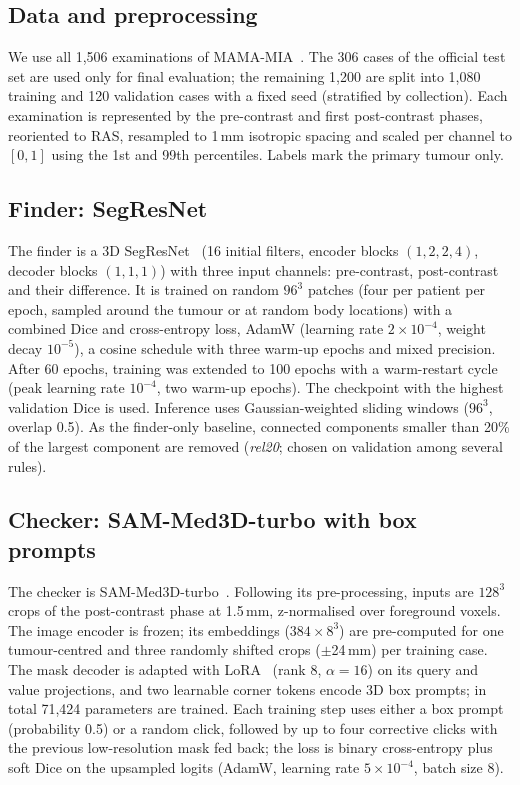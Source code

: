 \documentclass[journal]{IEEEtran}
\begin{document}
\subsection{Data and preprocessing}
We use all 1,506 examinations of MAMA-MIA~\cite{garrucho2025mamamia}. The 306 cases of the official test set are used only for final evaluation; the remaining 1,200 are split into 1,080 training and 120 validation cases with a fixed seed (stratified by collection). Each examination is represented by the pre-contrast and first post-contrast phases, reoriented to RAS, resampled to 1\,mm isotropic spacing and scaled per channel to $[0,1]$ using the 1st and 99th percentiles. Labels mark the primary tumour only.

\subsection{Finder: SegResNet}
The finder is a 3D SegResNet~\cite{myronenko2019segresnet} (16 initial filters, encoder blocks $(1,2,2,4)$, decoder blocks $(1,1,1)$) with three input channels: pre-contrast, post-contrast and their difference. It is trained on random $96^3$ patches (four per patient per epoch, sampled around the tumour or at random body locations) with a combined Dice and cross-entropy loss, AdamW (learning rate $2\times10^{-4}$, weight decay $10^{-5}$), a cosine schedule with three warm-up epochs and mixed precision. After 60 epochs, training was extended to 100 epochs with a warm-restart cycle (peak learning rate $10^{-4}$, two warm-up epochs). The checkpoint with the highest validation Dice is used. Inference uses Gaussian-weighted sliding windows ($96^3$, overlap 0.5). As the finder-only baseline, connected components smaller than 20\% of the largest component are removed (\emph{rel20}; chosen on validation among several rules).

\subsection{Checker: SAM-Med3D-turbo with box prompts}
The checker is SAM-Med3D-turbo~\cite{wang2023sammed3d}. Following its pre-processing, inputs are $128^3$ crops of the post-contrast phase at 1.5\,mm, z-normalised over foreground voxels. The image encoder is frozen; its embeddings ($384\times8^3$) are pre-computed for one tumour-centred and three randomly shifted crops ($\pm$24\,mm) per training case. The mask decoder is adapted with LoRA~\cite{hu2022lora} (rank 8, $\alpha=16$) on its query and value projections, and two learnable corner tokens encode 3D box prompts; in total 71,424 parameters are trained. Each training step uses either a box prompt (probability 0.5) or a random click, followed by up to four corrective clicks with the previous low-resolution mask fed back; the loss is binary cross-entropy plus soft Dice on the upsampled logits (AdamW, learning rate $5\times10^{-4}$, batch size 8).
\end{document}
